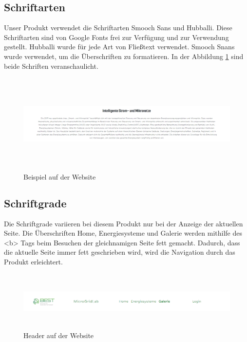 \subsection{Schriftarten}
Unser Produkt verwendet die Schriftarten Smooch Sans und Hubballi. Diese Schriftarten sind von Google Fonts frei zur Verfügung und zur Verwendung gestellt. Hubballi wurde für jede Art von Fließtext verwendet. Smooch Snans wurde verwendet, um die Überschriften zu formatieren. In der Abbildung \ref{fig: Beispiel auf der Website} sind beide Schriften veranschaulicht.
\begin{figure}[h]
	\centering
	\includegraphics[height=5cm,width=15cm]{images/Beispiel_Schriftarten}
	\caption{Beispiel auf der Website}
	\label{fig: Beispiel auf der Website}
\end{figure}
\newpage
\subsection{Schriftgrade}
Die Schriftgrade variieren bei diesem Produkt nur bei der Anzeige der aktuellen Seite.
Die Überschriften Home, Energiesysteme und Galerie werden mithilfe des <b> Tags beim Besuchen der gleichnamigen Seite fett gemacht. Dadurch, dass die aktuelle Seite immer fett geschrieben wird, wird die Navigation durch das Produkt erleichtert.
\begin{figure}[h]
	\centering
	\includegraphics[height=3cm,width=16cm]{images/Header}
	\caption{Header auf der Website}
	\label{fig: Header}
\end{figure}
\newpage
